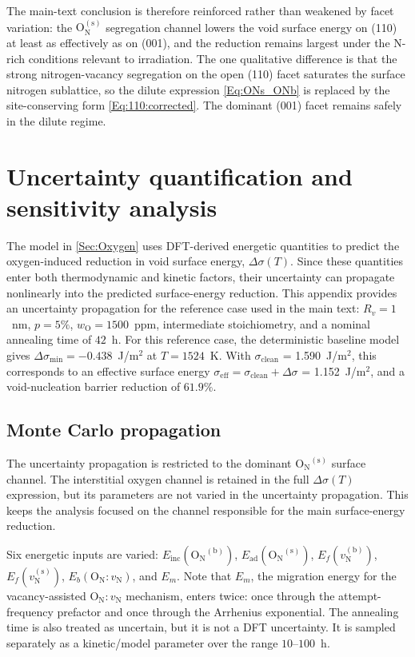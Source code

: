 \documentclass[preprint,12pt,sort&compress]{elsarticle}
\newcommand{\?}{\stackrel{?}{=}}
\begin{document}
The main-text conclusion is therefore reinforced rather than weakened by facet variation: the $\text{O}_\text{N}^{(\text{s})}$ segregation channel lowers the void surface energy on (110) at least as effectively as on (001), and the reduction remains largest under the N-rich conditions relevant to irradiation. The one qualitative difference is that the strong nitrogen-vacancy segregation on the open (110) facet saturates the surface nitrogen sublattice, so the dilute expression \cref{Eq:ONs_ONb} is replaced by the site-conserving form \cref{Eq:110:corrected}. The dominant (001) facet remains safely in the dilute regime.

\section{Uncertainty quantification and sensitivity analysis}
\label{App:UQ}

The model in \cref{Sec:Oxygen} uses DFT-derived energetic quantities to predict the oxygen-induced reduction in void surface energy, $\Delta\sigma(T)$. Since these quantities enter both thermodynamic and kinetic factors, their uncertainty can propagate nonlinearly into the predicted surface-energy reduction. This appendix provides an uncertainty propagation for the reference case used in the main text: $R_v=1$~nm, $p=5\%$, $w_\mathrm{O}=1500$~ppm, intermediate stoichiometry, and a nominal annealing time of $42$~h. For this reference case, the deterministic baseline model gives $\Delta\sigma_\mathrm{min}=-0.438$~J/m$^{2}$ at $T=1524$~K. With $\sigma_\mathrm{clean}$ = 1.590~J/m$^{2}$, this corresponds to an effective surface energy $\sigma_\mathrm{eff}=\sigma_\mathrm{clean}+\Delta\sigma$ = 1.152~J/m$^{2}$, and a void-nucleation barrier reduction of $61.9\%$.

\subsection{Monte Carlo propagation}

The uncertainty propagation is restricted to the dominant $\mathrm{O_N}^{(\mathrm{s})}$ surface channel. The interstitial oxygen channel is retained in the full $\Delta\sigma(T)$ expression, but its parameters are not varied in the uncertainty propagation. This keeps the analysis focused on the channel responsible for the main surface-energy reduction.

Six energetic inputs are varied: $E_\mathrm{inc}(\mathrm{O_N}^{(\mathrm{b})})$, $E_\mathrm{ad}(\mathrm{O_N}^{(\mathrm{s})})$, $E_f(v_\mathrm{N}^{(\mathrm{b})})$, $E_f(v_\mathrm{N}^{(\mathrm{s})})$, $E_b(\mathrm{O_N}:v_\mathrm{N})$, and $E_m$. Note that $E_m$, the migration energy for the vacancy-assisted $\mathrm{O_N}:v_\mathrm{N}$ mechanism, enters twice: once through the attempt-frequency prefactor and once through the Arrhenius exponential. The annealing time is also treated as uncertain, but it is not a DFT uncertainty. It is sampled separately as a kinetic/model parameter over the range $10$--$100$~h.
\end{document}
